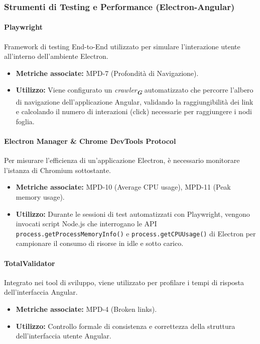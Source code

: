 \documentclass[a4paper,12pt]{article}
\newcommand{\glossario}[1]{\textit{#1}\textsubscript{\textbf{\textit{\textcolor{lightblack}{G}}}}}
\begin{document}
\subsubsection{Strumenti di Testing e Performance (Electron-Angular)}

\paragraph{Playwright}
Framework di testing End-to-End utilizzato per simulare l'interazione utente
all'interno dell'ambiente Electron.
\begin{itemize}
    \item \textbf{Metriche associate:} MPD-7 (Profondità di Navigazione).
    \item \textbf{Utilizzo:} Viene configurato un \glossario{crawler} automatizzato che percorre l'albero di navigazione dell'applicazione Angular, validando la raggiungibilità dei link e calcolando il numero di interazioni (click) necessarie per raggiungere i nodi foglia.
\end{itemize}

\paragraph{Electron Manager \& Chrome DevTools Protocol}
Per misurare l'efficienza di un'applicazione Electron, è necessario monitorare
l'istanza di Chromium sottostante.
\begin{itemize}
    \item \textbf{Metriche associate:} MPD-10 (Average CPU usage), MPD-11 (Peak memory usage).
    \item \textbf{Utilizzo:} Durante le sessioni di test automatizzati con Playwright, vengono invocati script Node.js che interrogano le API \texttt{process.getProcessMemoryInfo()} e \texttt{process.getCPUUsage()} di Electron per campionare il consumo di risorse in idle e sotto carico.
\end{itemize}

\paragraph{TotalValidator}
Integrato nei tool di sviluppo, viene utilizzato per profilare i tempi di
risposta dell'interfaccia Angular.
\begin{itemize}
    \item \textbf{Metriche associate:} MPD-4 (Broken links).
    \item \textbf{Utilizzo:} Controllo formale di consistenza e correttezza della struttura dell'interfaccia utente Angular.
\end{itemize}
\end{document}
